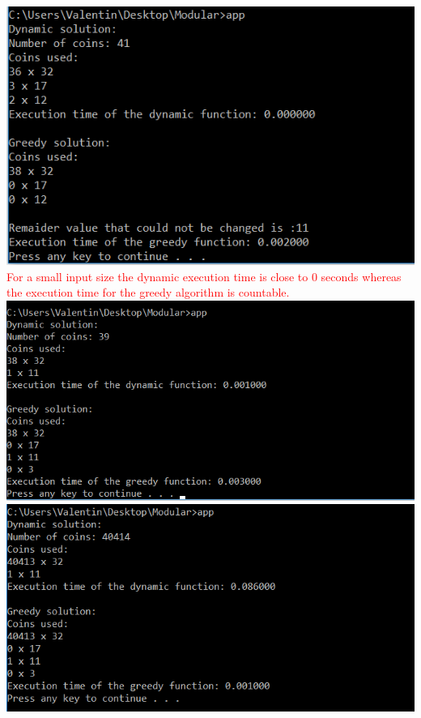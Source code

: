 \documentclass[12]{article}
\begin{document}
\includegraphics[scale=0.6]{gcc-2.png}
\\

\textcolor{red}{For a small input size the dynamic execution time is close to 0 seconds whereas the execution time for the greedy algorithm is countable.}\\

\includegraphics[scale=0.6]{gcc-3.png}\\

\includegraphics[scale=0.6]{gcc-4.png}\\
\end{document}
